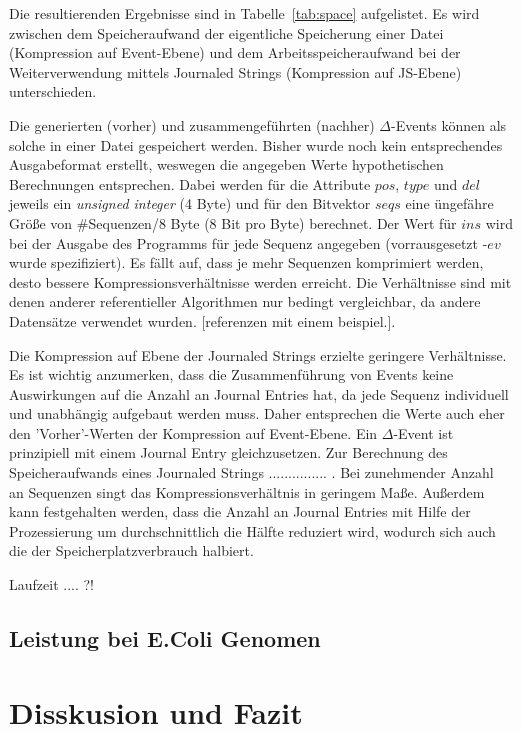 \documentclass[12pt]{article}
\begin{document}
Die resultierenden Ergebnisse sind in Tabelle~\ref{tab:space} aufgelistet. Es wird zwischen dem Speicheraufwand der eigentliche Speicherung einer Datei (Kompression auf Event-Ebene) und dem Arbeitsspeicheraufwand bei der Weiterverwendung mittels Journaled Strings (Kompression auf JS-Ebene) unterschieden.

Die generierten (vorher) und zusammengeführten (nachher) $\Delta$-Events können als solche in einer Datei gespeichert werden. Bisher wurde noch kein entsprechendes Ausgabeformat erstellt, weswegen die angegeben Werte hypothetischen Berechnungen entsprechen. Dabei werden für die Attribute $pos$, $type$ und $del$ jeweils ein \textit{unsigned integer} (4 Byte) und für den Bitvektor $seqs$ eine üngefähre Größe von $\#$Sequenzen/8 Byte (8 Bit pro Byte) berechnet. Der Wert für $ins$ wird bei der Ausgabe des Programms für jede Sequenz angegeben (vorrausgesetzt -$ev$ wurde spezifiziert). Es fällt auf, dass je mehr Sequenzen komprimiert werden, desto bessere Kompressionsverhältnisse werden erreicht. Die Verhältnisse sind mit denen anderer referentieller Algorithmen nur bedingt vergleichbar, da andere Datensätze verwendet wurden. [referenzen mit einem beispiel.].

Die Kompression auf Ebene der Journaled Strings erzielte geringere Verhältnisse. Es ist wichtig anzumerken, dass die Zusammenführung von Events keine Auswirkungen auf die Anzahl an Journal Entries hat, da jede Sequenz individuell und unabhängig aufgebaut werden muss. Daher entsprechen die Werte auch eher den 'Vorher'-Werten der Kompression auf Event-Ebene. Ein $\Delta$-Event ist prinzipiell mit einem Journal Entry gleichzusetzen. Zur Berechnung des Speicheraufwands eines Journaled Strings ............... .
Bei zunehmender Anzahl an Sequenzen singt das Kompressionsverhältnis in geringem Maße. Außerdem kann festgehalten werden, dass die Anzahl an Journal Entries mit Hilfe der Prozessierung um durchschnittlich die Hälfte reduziert wird, wodurch sich auch die der Speicherplatzverbrauch halbiert.

Laufzeit .... ?!

\subsection{Leistung bei E.Coli Genomen}

\section{Disskusion und Fazit}
\pagebreak

\end{document}
